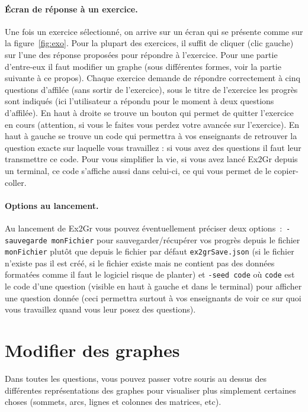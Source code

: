 \documentclass[a4paper]{article}
\begin{document}
\paragraph{Écran de réponse à un exercice.}
Une fois un exercice sélectionné, on arrive sur un écran qui se présente comme sur la figure~\ref{fig:exo}.
Pour la plupart des exercices, il suffit de cliquer (clic gauche) sur l'une des réponse proposées pour répondre à l'exercice.
Pour une partie d'entre-eux il faut modifier un graphe (sous différentes formes, voir la partie suivante à ce propos).
Chaque exercice demande de répondre correctement à cinq questions d'affilée (sans sortir de l'exercice), sous le titre de l'exercice les progrès sont indiqués (ici l'utilisateur a répondu pour le moment à deux questions d'affilée).
En haut à droite se trouve un bouton qui permet de quitter l'exercice en cours (attention, si vous le faites vous perdez votre avancée sur l'exercice).
En haut à gauche se trouve un code qui permettra à vos enseignants de retrouver la question exacte sur laquelle vous travaillez : si vous avez des questions il faut leur transmettre ce code.
Pour vous simplifier la vie, si vous avez lancé Ex2Gr depuis un terminal, ce code s'affiche aussi dans celui-ci, ce qui vous permet de le copier-coller.

\paragraph{Options au lancement.}
Au lancement de Ex2Gr vous pouvez éventuellement préciser deux options~: \verb|-sauvegarde monFichier| pour sauvegarder/récupérer vos progrès depuis le fichier \verb|monFichier| plutôt que depuis le fichier par défaut \verb|ex2grSave.json| (si le fichier n'existe pas il est créé, si le fichier existe mais ne contient pas des données formatées comme il faut le logiciel risque de planter) et \verb|-seed code| où \verb|code| est le code d'une question (visible en haut à gauche et dans le terminal) pour afficher une question donnée (ceci permettra surtout à vos enseignants de voir ce sur quoi vous travaillez quand vous leur posez des questions).

\section*{Modifier des graphes}

Dans toutes les questions, vous pouvez passer votre souris au dessus des différentes représentations des graphes pour visualiser plus simplement certaines choses (sommets, arcs, lignes et colonnes des matrices, etc).
\end{document}
